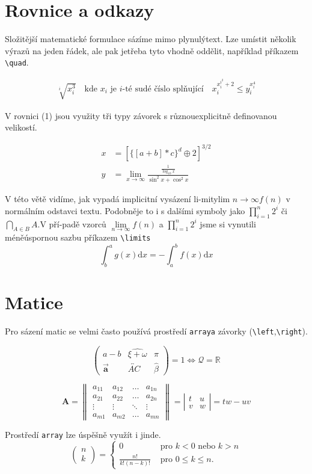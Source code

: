 \documentclass[a4paper, twocolumn,11pt]{article}
\theoremstyle{definition}
\begin{document}
\section{Rovnice a odkazy}
Složitější matematické formulace sázíme mimo plynulýtext. Lze umístit několik výrazů na jeden řádek, ale pak jetřeba tyto vhodně oddělit, například příkazem \verb!\quad!.


$$
\begin{aligned}
\sqrt[i]{x_{i}^{3}} \quad \text{kde $x_i$ je $i$-té sudé číslo splňující} \quad x_{i}^{x_{i}^{i^{2}}+2} \leq y_{i}^{x_{i}^{4}}
\end{aligned}
$$

V rovnici (1) jsou využity tři typy závorek s různouexplicitně definovanou velikostí.

\begin{align}
x&=\left[\{[a+b] * c\}^{d} \oplus 2\right]^{3 / 2}
\\
y&=\lim _{x \rightarrow \infty} \frac{\frac{1}{\log _{10} x}}{\sin ^{2} x+\cos ^{2} x}
\nonumber
\end{align}


V této větě vidíme, jak vypadá implicitní vysázení li-mitylim $n \rightarrow \infty f(n)$ v normálním odstavci textu. Podobněje to i s dalšími symboly jako $\prod_{i=1}^{n} 2^{i}$ či $\bigcap_{A \in B} A$.V pří-padě vzorců $\lim\limits_{n\to\infty}f(n)$
 a $\prod\limits_{i=1}^{n} 2^{i}$
 jsme si vynutili méněúspornou sazbu příkazem \verb!\limits!
\begin{equation}
\int_{b}^{a} g(x) \mathrm{d} x=-\int_{a}^{b} f(x) \mathrm{d} x
\end{equation}
\section{Matice}
Pro sázení matic se velmi často používá prostředí \verb!arraya! závorky (\verb!\left!,\verb!\right!).

$$\left(\begin{array}{ccc}
a-b & \widehat{\xi+\omega} & \pi \\
\overrightarrow{\mathbf{a}} & \overleftrightarrow{A C} & \hat{\beta}
\end{array}\right)=1 \Longleftrightarrow \mathcal{Q}=\mathbb{R}$$

$$\mathbf{A}=\left\|\begin{array}{cccc}
a_{11} & a_{12} & \ldots & a_{1 n} \\
a_{21} & a_{22} & \ldots & a_{2 n} \\
\vdots & \vdots & \ddots & \vdots \\
a_{m 1} & a_{m 2} & \ldots & a_{m n}
\end{array}\right\|=\left|\begin{array}{cc}
t & u \\
v & w
\end{array}\right|=t w-u v$$

Prostředí \verb!array! lze úspěšně využít i jinde.
$$\left(\begin{array}{l}
n \\
k
\end{array}\right)=\left\{\begin{array}{cl}
0 & \text { pro } k<0 \text { nebo } k>n \\
\frac{n !}{k !(n-k) !} & \text { pro } 0 \leq k \leq n.
\end{array}\right.$$
\end{document}
